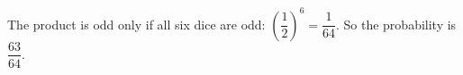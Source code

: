 The product is odd only if all six dice are odd: $\left(\dfrac12\right)^6=\dfrac1{64}$. So the probability is $\boxed{\dfrac{63}{64}}$.

